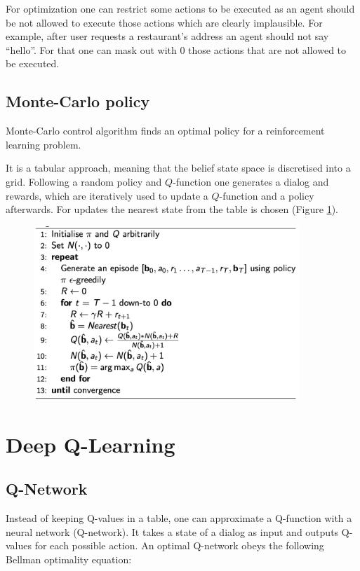 \documentclass[12pt,titlepage,a4paper]{article}
\begin{document}
For optimization one can restrict some actions to be executed as an agent should be not allowed to execute those actions which are clearly implausible. For example, after user requests a restaurant's address an agent should not say ``hello”. For that one can mask out with 0 those actions that are not allowed to be executed.

\subsection{Monte-Carlo policy}

Monte-Carlo control algorithm finds an optimal policy for a reinforcement learning problem.

It is a tabular approach, meaning that the belief state space is discretised into a grid. Following a random policy and $Q$-function one generates a dialog and rewards, which are iteratively used to update a $Q$-function and a policy afterwards. For updates the nearest state from the table is chosen (Figure \ref{fig:MCC}). 

\begin{figure}[!h]
    \centering
    \includegraphics[width=10cm]{MCC.png}
    \caption{}
    \label{fig:MCC}
\end{figure}


\pagebreak


\section{Deep Q-Learning}

\subsection{Q-Network}
Instead of keeping Q-values in a table, one can approximate a Q-function with a neural network (Q-network). It takes a state of a dialog as input and outputs Q-values for each possible action. An optimal Q-network obeys the following Bellman optimality equation: 
\end{document}
